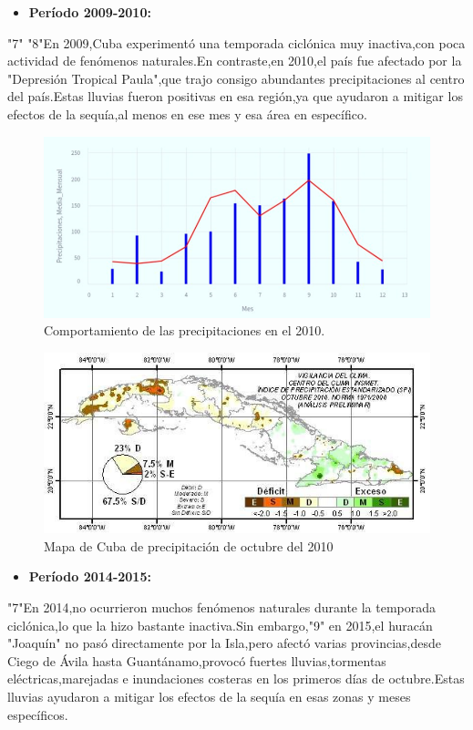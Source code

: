 \documentclass[12pt]{article}
\begin{document}
\begin{itemize}
	\item\textbf{Período 2009-2010:}
\end{itemize}


"7" "8"En 2009,Cuba experimentó una temporada ciclónica muy inactiva,con poca actividad de fenómenos naturales.En contraste,en 2010,el país fue afectado por la "Depresión Tropical Paula",que trajo consigo abundantes precipitaciones al centro del país.Estas lluvias fueron positivas en esa región,ya que ayudaron a mitigar los efectos de la sequía,al menos en ese mes y esa área en específico.\\

\begin{figure}[H]
	\centering
	\includegraphics[width=0.6\linewidth]{./Informe/images/precipitaciones_2010}
	\caption{Comportamiento de las precipitaciones en el 2010.}
	\label{fig:precipitaciones2010}
\end{figure}


\begin{figure}[H]
	\centering
	\includegraphics[width=0.7\linewidth]{./Informe/images/mapa}
	\caption{Mapa de Cuba de precipitación de octubre del 2010}
	\label{fig:mapa}
\end{figure}

\begin{itemize}
	\item \textbf{Período 2014-2015:}
\end{itemize}


"7"En 2014,no ocurrieron muchos fenómenos naturales durante la temporada ciclónica,lo que la hizo bastante inactiva.Sin embargo,"9" en 2015,el huracán "Joaquín" no pasó directamente por la Isla,pero afectó varias provincias,desde Ciego de Ávila hasta Guantánamo,provocó fuertes lluvias,tormentas eléctricas,marejadas e inundaciones costeras en los primeros días de octubre.Estas lluvias ayudaron a mitigar los efectos de la sequía en esas zonas y meses específicos.
\end{document}
